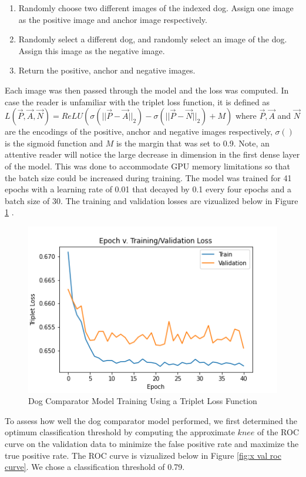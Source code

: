 \documentclass{article}
\begin{document}
    \begin{enumerate}
    
      \item Randomly choose two different images of the indexed dog.  Assign one image as the positive image and anchor image respectively. 
    
      \item Randomly select a different dog, and randomly select an image of the dog.  Assign this image as the negative image.
      
      \item Return the positive, anchor and negative images.
    
    \end{enumerate}

Each image was then passed through the model and the loss was computed.  In case the reader is unfamiliar with the triplet loss function,  it is defined as $L(\vec{P}, \vec{A}, \vec{N}) = ReLU(\sigma(||\vec{P}-\vec{A}||_2) - \sigma(||\vec{P}- \vec{N}||_2) + M)$ where $\vec{P}, \vec{A}$ and $\vec{N}$ are the encodings of the positive, anchor and negative images respectively, $\sigma()$ is the sigmoid function and $M$ is the margin that was set to 0.9.  Note, an attentive reader will notice the large decrease in dimension in the first dense layer of the model.  This was done to accommodate GPU memory limitations so that the batch size could be increased during training.   The model was trained for 41 epochs with a learning rate of 0.01 that decayed by 0.1 every four epochs and a batch size of 30.  The training and validation losses are vizualized below in Figure \ref{fig:x epoch_v_map} .

\begin{figure}[h]
\centering
	\includegraphics[scale=0.7]{final-report-images/triplet_training.png}
\caption{Dog Comparator Model Training Using a Triplet Loss Function}
\label{fig:x epoch_v_map}
\end{figure}
To assess how well the dog comparator model performed, we first determined the optimum classification threshold by computing the approximate $knee$ of the ROC curve on the validation data to minimize the false positive rate and maximize the true positive rate.  The ROC curve is vizualized below in Figure \ref{fig:x val roc curve}.  We chose a classification threshold of 0.79.
\end{document}
